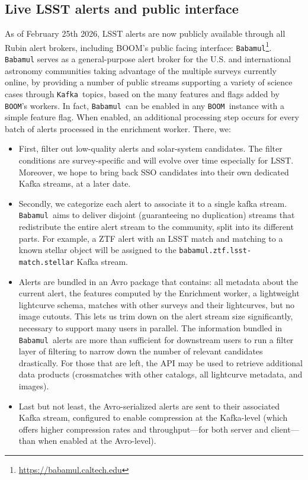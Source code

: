 \documentclass[twocolumn]{aastex631}
\newcommand{\boom}{\texttt{BOOM }}
\newcommand{\babamul}{\texttt{Babamul }}
\newcommand{\kafka}{\texttt{Kafka }}
\begin{document}
\subsection{Live LSST alerts and public interface}
\label{production}

As of February 25th 2026, LSST alerts are now publicly available through all Rubin alert brokers, including BOOM's public facing interface: \texttt{Babamul}\footnote{\url{https://babamul.caltech.edu}}. \texttt{Babamul} serves as a general-purpose alert broker for the U.S. and international astronomy communities taking advantage of the multiple surveys currently online, by providing a number of public streams supporting a variety of science cases through \kafka topics, based on the many features and flags added by \texttt{BOOM}'s workers. In fact, \babamul can be enabled in any \boom instance with a simple feature flag. When enabled, an additional processing step occurs for every batch of alerts processed in the enrichment worker. There, we:

\begin{itemize}
    \item First, filter out low-quality alerts and solar-system candidates. The filter conditions are survey-specific and will evolve over time especially for LSST. Moreover, we hope to bring back SSO candidates into their own dedicated Kafka streams, at a later date.
    \item Secondly, we categorize each alert to associate it to a single kafka stream. \babamul aims to deliver disjoint (guaranteeing no duplication) streams that redistribute the entire alert stream to the community, split into its different parts. For example, a ZTF alert with an LSST match and matching to a known stellar object will be assigned to the \texttt{babamul.ztf.lsst-match.stellar} Kafka stream.
    \item Alerts are bundled in an Avro package that contains: all metadata about the current alert, the features computed by the Enrichment worker, a lightweight lightcurve schema, matches with other surveys and their lightcurves, but no image cutouts. This lets us trim down on the alert stream size significantly, necessary to support many users in parallel. The information bundled in \babamul alerts are more than sufficient for downstream users to run a filter layer of filtering to narrow down the number of relevant candidates drastically. For those that are left, the API may be used to retrieve additional data products (crossmatches with other catalogs, all lightcurve metadata, and images).
    \item Last but not least, the Avro-serialized alerts are sent to their associated Kafka stream, configured to enable compression at the Kafka-level (which offers higher compression rates and throughput---for both server and client---than when enabled at the Avro-level).
\end{itemize}
\end{document}
